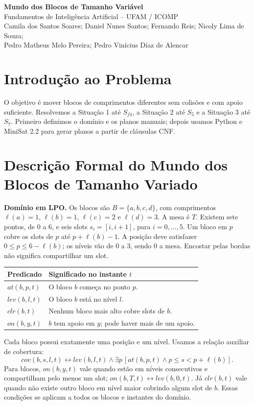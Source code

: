\documentclass[11pt,a4paper]{article}
\begin{document}
\begin{center}
{\Large\bfseries Mundo dos Blocos de Tamanho Variável}\\[5pt]
Fundamentos de Inteligência Artificial -- UFAM / ICOMP\\[6pt]
Camila dos Santos Soares; Daniel Nunes Santos; Fernando Reis; Nicoly Lima de Souza;\\
Pedro Matheus Melo Pereira; Pedro Vinícius Díaz de Alencar
\end{center}

\section{Introdução ao Problema}
O objetivo é mover blocos de comprimentos diferentes sem colisões e com apoio suficiente. Resolvemos a Situação 1 até $S_{f4}$, a Situação 2 até $S_5$ e a Situação 3 até $S_7$. Primeiro definimos o domínio e os planos manuais; depois usamos Python e MiniSat 2.2 para gerar planos a partir de cláusulas CNF.

\section{Descrição Formal do Mundo dos Blocos de Tamanho Variado}
\textbf{Domínio em LPO.} Os blocos são $B=\{a,b,c,d\}$, com comprimentos $\ell(a)=1$, $\ell(b)=1$, $\ell(c)=2$ e $\ell(d)=3$. A mesa é $T$. Existem sete pontos, de 0 a 6, e seis slots $s_i=[i,i+1]$, para $i=0,\ldots,5$. Um bloco em $p$ cobre os slots de $p$ até $p+\ell(b)-1$. A posição deve satisfazer $0\leq p\leq6-\ell(b)$; os níveis vão de 0 a 3, sendo 0 a mesa. Encostar pelas bordas não significa compartilhar um slot.

\begin{tabularx}{\linewidth}{lY}
\toprule Predicado & Significado no instante $t$ \\ \midrule
$at(b,p,t)$ & O bloco $b$ começa no ponto $p$.\\
$lev(b,l,t)$ & O bloco $b$ está no nível $l$.\\
$clr(b,t)$ & Nenhum bloco mais alto cobre slots de $b$.\\
$on(b,y,t)$ & $b$ tem apoio em $y$; pode haver mais de um apoio.\\ \bottomrule
\end{tabularx}

Cada bloco possui exatamente uma posição e um nível. Usamos a relação auxiliar de cobertura:
\[cov(b,s,l,t)\leftrightarrow lev(b,l,t)\land\exists p\,[at(b,p,t)\land p\leq s<p+\ell(b)].\]
Para blocos, $on(b,y,t)$ vale quando estão em níveis consecutivos e compartilham pelo menos um slot; $on(b,T,t)\leftrightarrow lev(b,0,t)$. Já $clr(b,t)$ vale quando não existe outro bloco em nível maior cobrindo algum slot de $b$. Essas condições se aplicam a todos os blocos e instantes do domínio.
\end{document}
